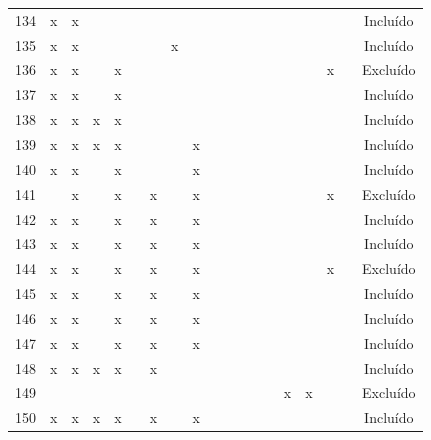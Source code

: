 \documentclass[
	12pt,				%
	oneside,			%
	a4paper,			%
	english,			%
	brazil				%
	]{abntex2ppgsi}
\begin{document}
\begin{apendicesenv}
\begin{table}[H]
\begin{tabular}{c | c c c c c c c c | c c c c c c c c c | c}
134 & x & x &   &   &   &   &   &   &   &   &   &   &   &   &   &   &   & Incluído \\
135 & x & x &   &   &   &   & x &   &   &   &   &   &   &   &   &   &   & Incluído \\
136 & x & x &   & x &   &   &   &   &   &   &   &   &   &   &   & x &   & Excluído \\
137 & x & x &   & x &   &   &   &   &   &   &   &   &   &   &   &   &   & Incluído \\
138 & x & x & x & x &   &   &   &   &   &   &   &   &   &   &   &   &   & Incluído \\
139 & x & x & x & x &   &   &   & x &   &   &   &   &   &   &   &   &   & Incluído \\
140 & x & x &   & x &   &   &   & x &   &   &   &   &   &   &   &   &   & Incluído \\
141 &   & x &   & x &   & x &   & x &   &   &   &   &   &   &   & x &   & Excluído \\
142 & x & x &   & x &   & x &   & x &   &   &   &   &   &   &   &   &   & Incluído \\
143 & x & x &   & x &   & x &   & x &   &   &   &   &   &   &   &   &   & Incluído \\
144 & x & x &   & x &   & x &   & x &   &   &   &   &   &   &   & x &   & Excluído \\
145 & x & x &   & x &   & x &   & x &   &   &   &   &   &   &   &   &   & Incluído \\
146 & x & x &   & x &   & x &   & x &   &   &   &   &   &   &   &   &   & Incluído \\
147 & x & x &   & x &   & x &   & x &   &   &   &   &   &   &   &   &   & Incluído \\
148 & x & x & x & x &   & x &   &   &   &   &   &   &   &   &   &   &   & Incluído \\
149 &   &   &   &   &   &   &   &   &   &   &   &   &   & x & x &   &   & Excluído \\
150 & x & x & x & x &   & x &   & x &   &   &   &   &   &   &   &   &   & Incluído \\
\bottomrule
\end{tabular}
\end{table}



\end{apendicesenv}
\end{document}
